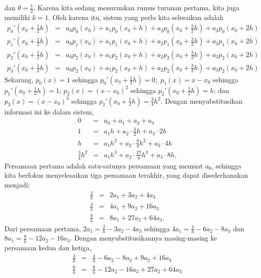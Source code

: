 \begin{description}
dan $\theta=\frac{1}{2}$. Karena kita sedang menurunkan rumus turunan
pertama, kita juga memiliki $k=1$. Oleh karena itu, sistem yang perlu
kita selesaikan adalah 
\begin{eqnarray*}
p_{0}'\left(x_{0}+\frac{1}{2}h\right) & = & a_{0}p_{0}(x_{0})+a_{1}p_{0}(x_{0}+h)+a_{2}p_{0}(x_{0}+\frac{3}{2}h)+a_{3}p_{0}(x_{0}+2h)\\
p_{1}'\left(x_{0}+\frac{1}{2}h\right) & = & a_{0}p_{1}(x_{0})+a_{1}p_{1}(x_{0}+h)+a_{2}p_{1}(x_{0}+\frac{3}{2}h)+a_{3}p_{1}(x_{0}+2h)\\
p_{2}'\left(x_{0}+\frac{1}{2}h\right) & = & a_{0}p_{2}(x_{0})+a_{1}p_{2}(x_{0}+h)+a_{2}p_{2}(x_{0}+\frac{3}{2}h)+a_{3}p_{2}(x_{0}+2h)\\
p_{3}'\left(x_{0}+\frac{1}{2}h\right) & = & a_{0}p_{2}(x_{0})+a_{1}p_{2}(x_{0}+h)+a_{2}p_{2}(x_{0}+\frac{3}{2}h)+a_{3}p_{2}(x_{0}+2h)
\end{eqnarray*}
Sekarang, $p_{0}(x)=1$ sehingga $p_{0}'(x_{0}+\frac{1}{2}h)=0;$
$p_{1}(x)=x-x_{0}$ sehingga $p_{1}'(x_{0}+\frac{1}{2}h)=1$; $p_{2}(x)=(x-x_{0})^{2}$
sehingga $p_{2}'(x_{0}+\frac{1}{2}h)=h$; dan $p_{3}(x)=(x-x_{0})^{3}$
sehingga $p_{3}'(x_{0}+\frac{1}{2}h)=\frac{3}{4}h^{2}$. Dengan menyubstitusikan
informasi ini ke dalam sistem,
\begin{eqnarray*}
0 & = & a_{0}+a_{1}+a_{2}+a_{3}\\
1 & = & a_{1}h+a_{2}\cdot\frac{3}{2}h+a_{3}\cdot2h\\
h & = & a_{1}h^{2}+a_{2}\cdot\frac{9}{4}h^{2}+a_{3}\cdot4h\\
\frac{3}{4}h^{2} & = & a_{1}h^{3}+a_{2}\cdot\frac{27}{8}h^{3}+a_{3}\cdot8h.
\end{eqnarray*}
Persamaan pertama adalah satu-satunya persamaan yang memuat $a_{0}$,
sehingga kita berfokus menyelesaikan tiga persamaan terakhir, yang
dapat disederhanakan menjadi:
\begin{eqnarray*}
\frac{2}{h} & = & 2a_{1}+3a_{2}+4a_{3}\\
\frac{4}{h} & = & 4a_{1}+9a_{2}+16a_{3}\\
\frac{6}{h} & = & 8a_{1}+27a_{2}+64a_{3}.
\end{eqnarray*}
Dari persamaan pertama, $2a_{1}=\frac{2}{h}-3a_{2}-4a_{3}$ sehingga
$4a_{1}=\frac{4}{h}-6a_{2}-8a_{3}$ dan $8a_{1}=\frac{8}{h}-12a_{2}-16a_{3}$.
Dengan menyubstitusikannya masing-masing ke persamaan kedua dan ketiga,
\begin{eqnarray*}
\frac{4}{h} & = & \frac{4}{h}-6a_{2}-8a_{3}+9a_{2}+16a_{3}\\
\frac{6}{h} & = & \frac{8}{h}-12a_{2}-16a_{3}+27a_{2}+64a_{3}

\end{eqnarray*}
\end{description}
